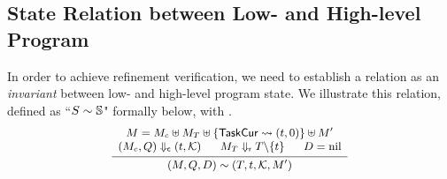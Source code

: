 \subsection{State Relation between Low- and High-level Program}
\label{subsec:state-rel}
In order to achieve refinement verification, we need to 
establish a relation as an {\it invariant} 
between low- and high-level program state. 
We illustrate this relation, defined as 
``${S} \sim {\mathbb{S}}$" 
formally below, with \Fig{\ref{fig:State Relation between 
Low- and High-level Program State}}.
\[
    \small
    \infer
    {
        \stateRel{(\Mem, \Rstate, \DBuf)}
            {(\thrdpool, \thrdid, \hthrdlocalst, \Mem')}
    }
    {
        \begin{array}{c}
            \Mem = \Mem_c \uplus \Mem_T \uplus 
                \{ \TaskCur \rightsquigarrow (\thrdid, 0) \}
                \uplus \Mem' \\
            \curStRel{(\Mem_c, \Rstate)}{(\thrdid, \hthrdlocalst)}
            \quad \ \ 
            \rdyStRel{\Mem_T}{\thrdpool \backslash \{ \thrdid \}}
            \quad \ \ 
            \DBuf = \nil
        \end{array}
    }
\]

